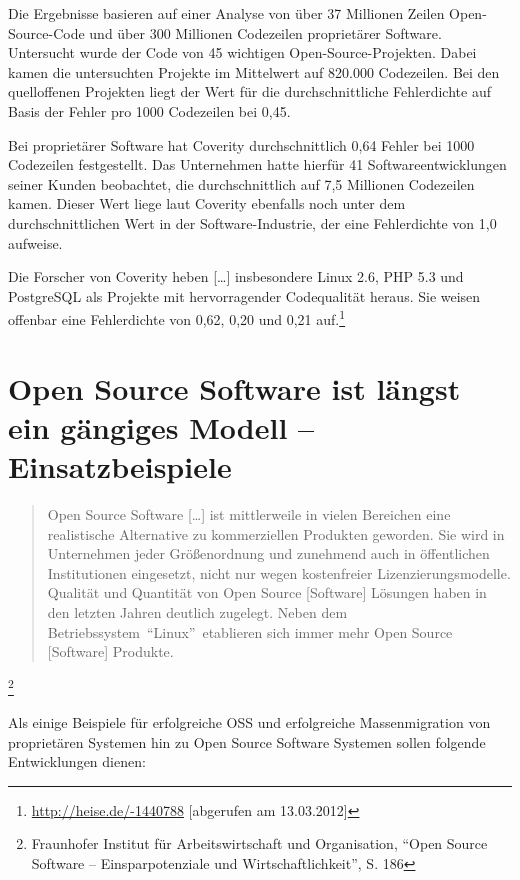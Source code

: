\documentclass[a4paper]{scrartcl}
\begin{document}
Die Ergebnisse basieren auf einer Analyse von über 37 Millionen Zeilen
Open-Source-Code und über 300 Millionen Codezeilen proprietärer
Software. Untersucht wurde der Code von 45 wichtigen
Open-Source-Projekten. Dabei kamen die untersuchten Projekte im Mittelwert auf
820.000 Codezeilen. Bei den quelloffenen Projekten liegt der Wert für die
durchschnittliche Fehlerdichte auf Basis der Fehler pro 1000 Codezeilen bei
0,45.

Bei proprietärer Software hat Coverity durchschnittlich 0,64 Fehler bei 1000
Codezeilen festgestellt. Das Unternehmen hatte hierfür 41 Softwareentwicklungen
seiner Kunden beobachtet, die durchschnittlich auf 7,5 Millionen Codezeilen
kamen. Dieser Wert liege laut Coverity ebenfalls noch unter dem
durchschnittlichen Wert in der Software-Industrie, der eine Fehlerdichte von 1,0
aufweise.

Die Forscher von Coverity heben [\ldots] insbesondere Linux 2.6, PHP 5.3 und
PostgreSQL als Projekte mit hervorragender Codequalität heraus.  Sie weisen
offenbar eine Fehlerdichte von 0,62, 0,20 und 0,21
auf.\footnote{\url{http://heise.de/-1440788} [abgerufen am 13.03.2012]}

\section{Open Source Software ist längst ein gängiges Modell -- Einsatzbeispiele}

\begin{quote}Open Source Software [\ldots] ist mittlerweile in vielen Bereichen
  eine realistische Alternative zu kommerziellen Produkten geworden. Sie wird in
  Unternehmen jeder Größenordnung und zunehmend auch in öffentlichen
  Institutionen eingesetzt, nicht nur wegen kostenfreier
  Lizenzierungsmodelle. Qualität und Quantität von Open Source [Software]
  Lösungen haben in den letzten Jahren deutlich zugelegt. Neben dem
  Betriebssystem~``Linux''~etablieren sich immer mehr Open Source [Software]
  Produkte.
\end{quote}\footnote{Fraunhofer Institut für Arbeitswirtschaft und Organisation,
  ``Open Source Software -- Einsparpotenziale und Wirtschaftlichkeit'', S. 186}

Als einige Beispiele für erfolgreiche OSS und erfolgreiche
Massenmigration von proprietären Systemen hin zu Open Source Software
Systemen sollen folgende Entwicklungen dienen:
\end{document}
